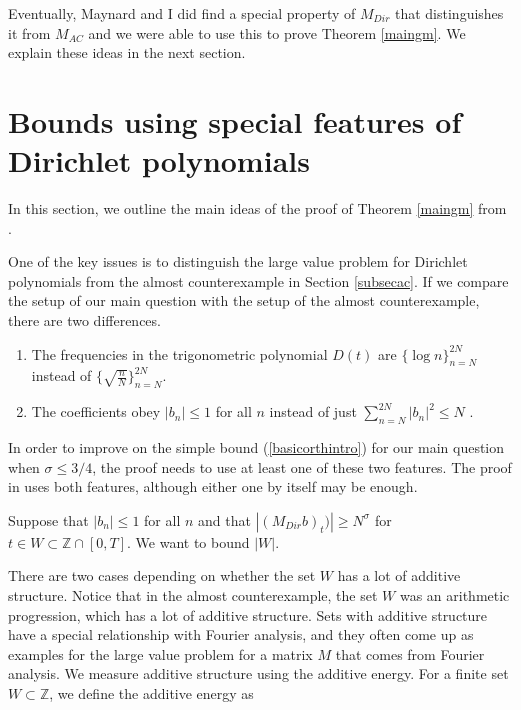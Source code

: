 \documentclass{amsart}
\newcommand{\ZZ}{\mathbb{Z}}
\begin{document}
Eventually, Maynard and I did find a special property of $M_{Dir}$ that distinguishes it from $M_{AC}$ and we were able to use this to prove Theorem \ref{maingm}.  We explain these ideas in the next section.




\section{Bounds using special features of Dirichlet polynomials}

In this section, we outline the main ideas of the proof of Theorem \ref{maingm} from \cite{GM}.

One of the key issues is to distinguish the large value problem for Dirichlet polynomials from the almost counterexample in Section \ref{subsecac}. 
If we compare the setup of our main question with the setup of the almost counterexample, there are two differences.

\begin{enumerate}

\item The frequencies in the trigonometric polynomial $D(t)$ are $\{ \log n \}_{n= N}^{2N}$ instead of $ \{ \sqrt{ \frac{n}{N}} \}_{n=N}^{2N}$.

\item The coefficients obey $|b_n| \le 1$ for all $n$ instead of just $\sum_{n=N}^{2N} |b_n|^2 \le N$ . 

\end{enumerate}

In order to improve on the simple bound (\ref{basicorthintro}) for our main question when $\sigma \le 3/4$, the proof needs to use at least one of these two features.  The proof in \cite{GM} uses both features, although either one by itself may be enough.

Suppose that $|b_n| \le 1$ for all $n$ and that $| (M_{Dir} b)_t) | \ge N^\sigma$ for $t \in W \subset \ZZ \cap [0, T]$.  We want to bound $|W|$.  

There are two cases depending on whether the set $W$ has a lot of additive structure.  Notice that in the almost counterexample, the set $W$ was an arithmetic progression, which has a lot of additive structure.  Sets with additive structure have a special relationship with Fourier analysis, and they often come up as examples for the large value problem for a matrix $M$ that comes from Fourier analysis.  We measure additive structure using the additive energy.  For a finite set $W \subset \ZZ$,  we define the additive energy as
\end{document}
